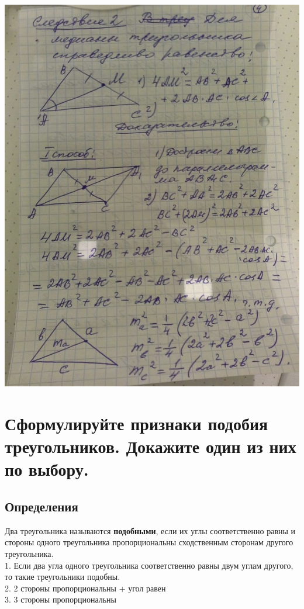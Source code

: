 \documentclass[12pt, letterpaper]{article}
\begin{document}
\includegraphics[scale=0.3]{bilet16-2.jpg} \\

\section {Сформулируйте признаки подобия треугольников. Докажите один из них по выбору.}
\subsection{Определения}
Два треугольника называются \textbf{подобными}, если их углы соответственно равны и стороны одного треугольника пропорциональны сходственным сторонам другого треугольника. \\
1. Если два угла одного треугольника соответственно равны двум углам другого, то такие треугольники подобны. \\
2. 2 стороны пропорциональны + угол равен \\
3. 3 стороны пропорциональны \\
\end{document}
